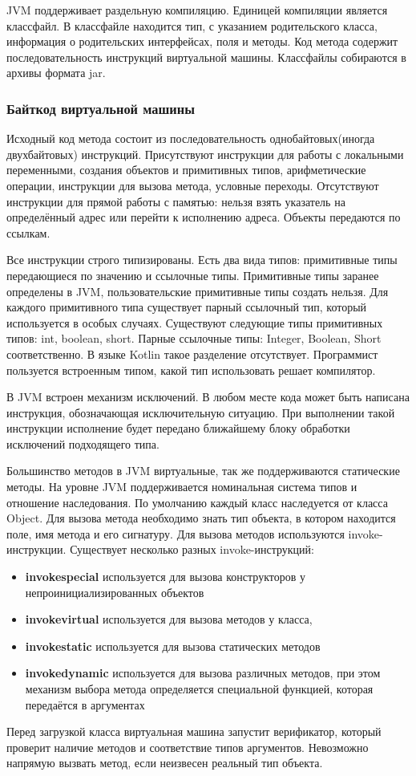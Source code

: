\documentclass{spbau-diploma}
\begin{document}
JVM поддерживает раздельную компиляцию. Единицей компиляции является классфайл. В классфайле находится тип, с указанием родительского класса, информация о родительских интерфейсах, поля и методы. Код метода содержит последовательность инструкций виртуальной машины. Классфайлы собираются в архивы формата jar.

\subsubsection{Байткод виртуальной машины}
Исходный код метода состоит из последовательность однобайтовых(иногда двухбайтовых) инструкций. Присутствуют инструкции для работы с локальными переменными, создания объектов и примитивных типов, арифметические операции, инструкции для вызова метода, условные переходы. Отсутствуют инструкции для прямой работы с памятью: нельзя взять указатель на определённый адрес или перейти к исполнению адреса. Объекты передаются по ссылкам.

Все инструкции строго типизированы. Есть два вида типов: примитивные типы передающиеся по значению и ссылочные типы. Примитивные типы заранее определены в JVM, пользовательские примитивные типы создать нельзя. Для каждого примитивного типа существует парный ссылочный тип, который используется в особых случаях. Существуют следующие типы примитивных типов: int, boolean, short. Парные ссылочные типы: Integer, Boolean, Short соответственно. В языке Kotlin такое разделение отсутствует. Программист пользуется встроенным типом, какой тип использовать решает компилятор.

В JVM встроен механизм исключений. В любом месте кода может быть написана инструкция, обозначающая исключительную ситуацию. При выполнении такой инструкции исполнение будет передано ближайшему блоку обработки исключений подходящего типа.

Большинство методов в JVM виртуальные, так же поддерживаются статические методы.
На уровне JVM поддерживается номинальная система типов и отношение наследования. По умолчанию каждый класс наследуется от класса Object. Для вызова метода необходимо знать тип объекта, в котором находится поле, имя метода и его сигнатуру. Для вызова методов используются invoke-инструкции. Существует несколько разных invoke-инструкций:
\begin{itemize}
    \item \textbf{invokespecial} используется для вызова конструкторов у непроинициализированных объектов
    \item \textbf{invokevirtual} используется для вызова методов у класса,
    \item \textbf{invokestatic} используется для вызова статических методов
    \item \textbf{invokedynamic} используется для вызова различных методов, при этом механизм выбора метода определяется специальной функцией, которая передаётся в аргументах
\end{itemize}
Перед загрузкой класса виртуальная машина запустит верификатор, который проверит наличие методов и соответствие типов аргументов. Невозможно напрямую вызвать метод, если неизвесен реальный тип объекта.
\end{document}
